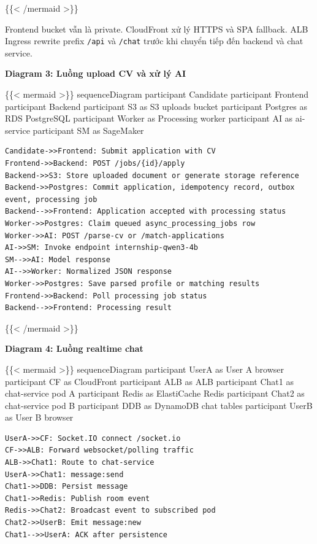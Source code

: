 \{\{\textless{} /mermaid \textgreater\}\}

Frontend bucket vẫn là private. CloudFront xử lý HTTPS và SPA fallback.
ALB Ingress rewrite prefix \texttt{/\allowbreak{}api} và \texttt{/\allowbreak{}chat} trước khi
chuyển tiếp đến backend và chat service.

\vspace{0.5em}\noindent\textbf{Diagram 3: Luồng upload CV và xử lý
AI}\par

\{\{\textless{} mermaid \textgreater\}\} sequenceDiagram participant
Candidate participant Frontend participant Backend participant S3 as S3
uploads bucket participant Postgres as RDS PostgreSQL participant Worker
as Processing worker participant AI as ai-service participant SM as
SageMaker

\begin{verbatim}
Candidate->>Frontend: Submit application with CV
Frontend->>Backend: POST /jobs/{id}/apply
Backend->>S3: Store uploaded document or generate storage reference
Backend->>Postgres: Commit application, idempotency record, outbox event, processing job
Backend-->>Frontend: Application accepted with processing status
Worker->>Postgres: Claim queued async_processing_jobs row
Worker->>AI: POST /parse-cv or /match-applications
AI->>SM: Invoke endpoint internship-qwen3-4b
SM-->>AI: Model response
AI-->>Worker: Normalized JSON response
Worker->>Postgres: Save parsed profile or matching results
Frontend->>Backend: Poll processing job status
Backend-->>Frontend: Processing result
\end{verbatim}

\{\{\textless{} /mermaid \textgreater\}\}

\vspace{0.5em}\noindent\textbf{Diagram 4: Luồng realtime
chat}\par

\{\{\textless{} mermaid \textgreater\}\} sequenceDiagram participant
UserA as User A browser participant CF as CloudFront participant ALB as
ALB participant Chat1 as chat-service pod A participant Redis as
ElastiCache Redis participant Chat2 as chat-service pod B participant
DDB as DynamoDB chat tables participant UserB as User B browser

\begin{verbatim}
UserA->>CF: Socket.IO connect /socket.io
CF->>ALB: Forward websocket/polling traffic
ALB->>Chat1: Route to chat-service
UserA->>Chat1: message:send
Chat1->>DDB: Persist message
Chat1->>Redis: Publish room event
Redis->>Chat2: Broadcast event to subscribed pod
Chat2->>UserB: Emit message:new
Chat1-->>UserA: ACK after persistence
\end{verbatim}


